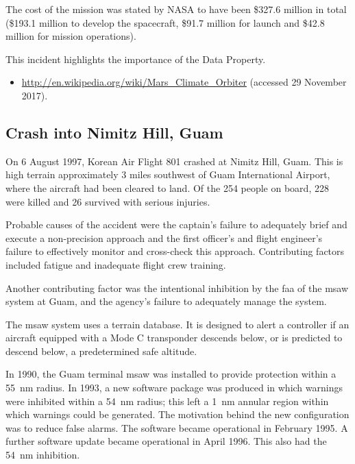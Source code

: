 The cost of the mission was stated by NASA to have been \$327.6 million in total (\$193.1 million to develop the spacecraft, \$91.7 million for launch and \$42.8 million for mission operations). 

This incident highlights the importance of the  Data Property.

\begin{itemize}
  \item \raggedright{\href{http://en.wikipedia.org/wiki/Mars_Climate_Orbiter}{http://en.wikipedia.org/wiki/Mars\_Climate\_Orbiter} (accessed 29 November 2017).}
\end{itemize}


\subsection{Crash into Nimitz Hill, Guam \label{bkm:incacc:nimitzhill}}
On 6 August 1997, Korean Air Flight 801 crashed at Nimitz Hill, Guam. This is high terrain approximately 3 miles southwest of Guam International Airport, where the aircraft had been cleared to land. Of the 254 people on board, 228 were killed and 26 survived with serious injuries.

Probable causes of the accident were the captain's failure to adequately brief and execute a non-precision approach and the first officer's and flight engineer's failure to effectively monitor and cross-check this approach. Contributing factors included fatigue and inadequate flight crew training.

Another contributing factor was the intentional inhibition by the \gls{faa} of the \gls{msaw} system at Guam, and the agency's failure to adequately manage the system.

The \gls{msaw} system uses a terrain \gls{database}. It is designed to alert a controller if an aircraft equipped with a Mode C transponder descends below, or is predicted to descend below, a predetermined safe altitude.

In 1990, the Guam terminal \gls{msaw} was installed to provide protection within a 55~nm radius. In 1993, a new software package was produced in which warnings were inhibited within a 54~nm radius; this left a 1~nm annular region within which warnings could be generated. The motivation behind the new configuration was to reduce false alarms. The software became operational in February 1995. A further software update became operational in April 1996. This also had the 54~nm inhibition.

